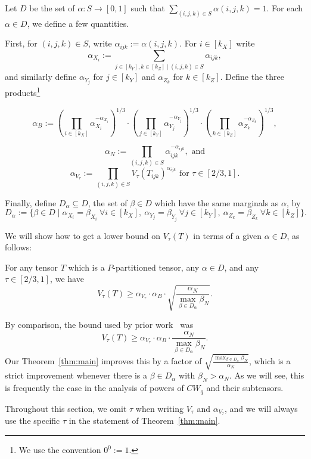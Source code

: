 \documentclass{theoretics}
\begin{document}
Let $D$ be the set of $\alpha : S \to [0,1]$  such that $\sum_{(i,j,k) \in S} \alpha(i,j,k) = 1$. For each $\alpha\in D$, we define a few quantities. 

First, for $(i,j,k) \in S$, write $\alpha_{ijk} := \alpha(i,j,k)$. 
For $i \in [k_X]$ write $$\alpha_{X_i} := \sum_{j \in [k_Y], k \in [k_Z] \mid (i,j,k) \in S} \alpha_{ijk},$$ and similarly define $\alpha_{Y_j}$ for $j \in [k_Y]$ and $\alpha_{Z_k}$ for $k \in [k_Z]$. Define the three products\footnote{We use the convention $0^0 := 1$.}

$$\alpha_B := \left( \prod_{i \in [k_X]} \alpha_{X_i}^{-\alpha_{X_i}} \right)^{1/3} \cdot \left( \prod_{j \in [k_Y]} \alpha_{Y_j}^{-\alpha_{Y_j}} \right)^{1/3} \cdot \left( \prod_{k \in [k_Z]} \alpha_{Z_k}^{-\alpha_{Z_k}} \right)^{1/3},$$

$$\alpha_N := \prod_{(i,j,k) \in S} \alpha_{ijk}^{-\alpha_{ijk}} , \text{ and}$$
$$\alpha_{V_\tau} := \prod_{(i,j,k) \in S} V_\tau(T_{ijk})^{\alpha_{ijk}} \text{ for } \tau \in [2/3,1].$$

Finally, define $D_\alpha \subseteq D$, the set of $\beta \in D$ which have the same marginals as $\alpha$, by $$D_\alpha := \{ \beta \in D \mid \alpha_{X_i}=\beta_{X_i} ~\forall i \in [k_X],~ \alpha_{Y_j}=\beta_{Y_j} ~\forall j\in [k_Y],~ \alpha_{Z_k}=\beta_{Z_k} ~\forall k \in [k_Z] \}.$$

We will show how to get a lower bound on $V_\tau(T)$ in terms of a given $\alpha \in D$, as follows:
\begin{theorem} \label{thm:main}
For any tensor $T$ which is a $P$-partitioned tensor, any $\alpha \in D$, and any $\tau \in [2/3,1]$, we have
$$V_\tau(T) \geq \alpha_{V_\tau} \cdot \alpha_B \cdot \sqrt{\frac{\alpha_N}{\max_{\beta \in D_\alpha} \beta_N}}.$$
\end{theorem}

By comparison, the bound used by prior work~\cite{v12,legall} was 
$$V_\tau(T) \geq \alpha_{V_\tau} \cdot \alpha_B \cdot \frac{\alpha_N}{\max_{\beta \in D_\alpha} \beta_N}.$$ Our Theorem~\ref{thm:main} improves this by a factor of $\sqrt{\frac{\max_{\beta \in D_\alpha} \beta_N}{\alpha_N}}$, which is a strict improvement whenever there is a $\beta \in D_\alpha$ with $\beta_N > \alpha_N$. As we will see, this is frequently the case in the analysis of powers of $CW_q$ and their subtensors.

Throughout this section, we omit $\tau$ when writing $V_\tau$ and $\alpha_{V_\tau}$, and we will always use the specific $\tau$ in the statement of Theorem~\ref{thm:main}.
\end{document}
